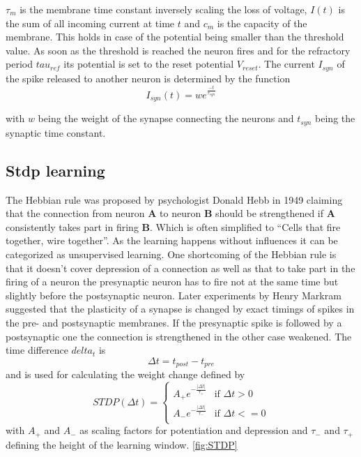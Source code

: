 $\tau_m$ is the membrane time constant inversely scaling the loss of voltage,  $I(t)$ is the sum of all incoming current at time $t$ and $c_m$ is the capacity of the membrane. This holds in case of the potential being smaller than the threshold value. As soon as the threshold is reached the neuron fires and for the refractory period $tau_{ref}$ its potential is set to the reset potential $V_{reset}$. The current $I_{syn}$ of the spike released to another neuron is determined by the function
\begin{equation}
  I_{syn}(t)=we^{\frac{-t}{\tau_{syn}}}
\end{equation}

with $w$ being the weight of the synapse connecting the neurons and $t_{syn}$ being the synaptic time constant.

\subsection{Stdp learning}
The Hebbian rule was proposed by psychologist Donald Hebb in 1949 claiming that the connection from neuron \textbf{A} to neuron \textbf{B} should be strengthened if \textbf{A} consistently takes part in firing \textbf{B}. Which is often simplified to “Cells that fire together, wire together”. As the learning happens without influences it can be categorized as unsupervised learning.
One shortcoming of the Hebbian rule is that it doesn’t cover depression of a connection as well as that to take part in the firing of a neuron the presynaptic neuron has to fire not at the same time but slightly before the postsynaptic neuron.
Later experiments by Henry Markram suggested that the plasticity of a synapse is changed by exact timings of spikes in the pre- and postsynaptic membranes. If the presynaptic spike is followed by a postsynaptic one the connection is strengthened in the other case weakened.
The time difference $delta_t$ is
\begin{equation}
  \Delta t = t_{post} - t_{pre}
\end{equation}
and is used for calculating the weight change defined by
\begin{equation}
  STDP(\Delta t) = 
  \begin{cases}
    A_+ e^{-\frac{\vert \Delta t \vert }{\tau_+}} & \text{if $\Delta t>0$} \\
    A_- e^{-\frac{\vert \Delta t \vert }{\tau_-}} & \text{if $\Delta t<=0$} \\
  \end{cases}
\end{equation}
with $A_+$ and $A_-$ as scaling factors for potentiation and depression and $\tau_-$ and $\tau_+$ defining the height of the learning window. \autoref{fig:STDP}

